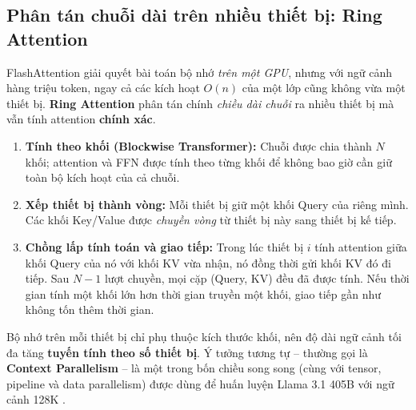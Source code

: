 \subsection{Phân tán chuỗi dài trên nhiều thiết bị: Ring Attention \newtag}
\label{ssec:ring_attention}
FlashAttention giải quyết bài toán bộ nhớ \emph{trên một GPU}, nhưng với ngữ cảnh hàng triệu token, ngay cả các kích hoạt $O(n)$ của một lớp cũng không vừa một thiết bị. \textbf{Ring Attention} \cite{liu2023ring} phân tán chính \emph{chiều dài chuỗi} ra nhiều thiết bị mà vẫn tính attention \textbf{chính xác}.

\begin{enumerate}
	\item \textbf{Tính theo khối (Blockwise Transformer):} Chuỗi được chia thành $N$ khối; attention và FFN được tính theo từng khối để không bao giờ cần giữ toàn bộ kích hoạt của cả chuỗi.
	\item \textbf{Xếp thiết bị thành vòng:} Mỗi thiết bị giữ một khối Query của riêng mình. Các khối Key/Value được \emph{chuyền vòng} từ thiết bị này sang thiết bị kế tiếp.
	\item \textbf{Chồng lấp tính toán và giao tiếp:} Trong lúc thiết bị $i$ tính attention giữa khối Query của nó với khối KV vừa nhận, nó đồng thời gửi khối KV đó đi tiếp. Sau $N-1$ lượt chuyền, mọi cặp (Query, KV) đều đã được tính. Nếu thời gian tính một khối lớn hơn thời gian truyền một khối, giao tiếp gần như không tốn thêm thời gian.
\end{enumerate}
Bộ nhớ trên mỗi thiết bị chỉ phụ thuộc kích thước khối, nên độ dài ngữ cảnh tối đa tăng \textbf{tuyến tính theo số thiết bị}. Ý tưởng tương tự -- thường gọi là \textbf{Context Parallelism} -- là một trong bốn chiều song song (cùng với tensor, pipeline và data parallelism) được dùng để huấn luyện Llama 3.1 405B với ngữ cảnh 128K \cite{grattafiori2024llama3}.

\begin{center}
\label{fig:ring_attention}
\end{center}

